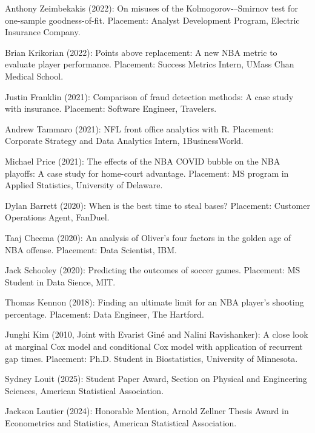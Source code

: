 \documentclass[Statistics]{vita}
\begin{document}
\begin{vita}
\begin{Students}
\begin{UndergraduateHonor}
    \item Anthony Zeimbekakis (2022): On misuses of the Kolmogorov-–Smirnov test for one-sample goodness-of-fit. Placement: Analyst Development Program, Electric Insurance Company.
    \item Brian Krikorian (2022): Points above replacement: A new NBA metric to evaluate player performance. Placement: Success Metrics Intern, UMass Chan Medical School.
    \item Justin Franklin (2021): Comparison of fraud detection methods: A case study with insurance. Placement: Software Engineer, Travelers.
    \item Andrew Tammaro (2021): NFL front office analytics with R. Placement: Corporate Strategy and Data Analytics Intern, 1BusinessWorld.
    \item Michael Price (2021): The effects of the NBA COVID bubble on the NBA playoffs: A case study for home-court advantage. Placement: MS program in Applied Statistics, University of Delaware.
    \item Dylan Barrett (2020): When is the best time to steal bases? Placement: Customer Operations Agent, FanDuel.
    \item Taaj Cheema (2020): An analysis of Oliver’s four factors in the golden age of NBA offense. Placement: Data Scientist, IBM.
    \item Jack Schooley (2020): Predicting the outcomes of soccer games. Placement: MS Student in Data Sience, MIT.
    \item Thomas Kennon (2018): Finding an ultimate limit for an NBA player's shooting percentage. Placement: Data Engineer, The Hartford.
    \item Junghi Kim (2010, Joint with Evarist Gin\'e and Nalini Ravishanker): A close look at marginal Cox model and conditional Cox model with application of recurrent gap times. Placement: Ph.D. Student in Biostatistics, University of Minnesota.
    \end{UndergraduateHonor}
  \end{Students}
  \begin{TeachingAccomplishments}
    \begin{StudentAwards}
    \item Sydney Louit (2025): Student Paper Award, Section on Physical and Engineering Sciences, American Statistical Association.
    \item Jackson Lautier (2024): Honorable Mention, Arnold Zellner Thesis Award in Econometrics and Statistics, American Statistical Association.

\end{StudentAwards}
\end{TeachingAccomplishments}
\end{vita}
\end{document}
